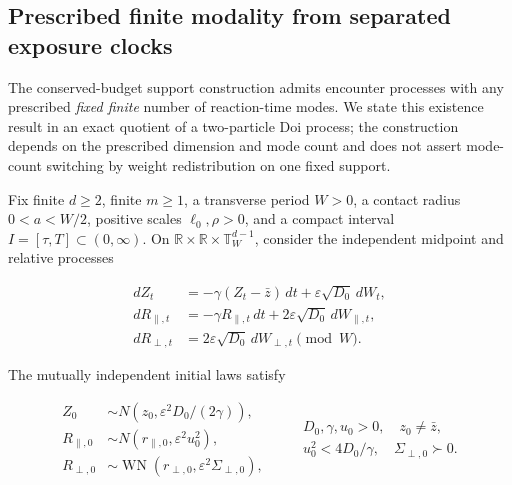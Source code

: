 
\subsection{Prescribed finite modality from separated exposure clocks}
\label{sec:exact-m-spine}

The conserved-budget support construction admits encounter processes with any
prescribed \emph{fixed finite} number of reaction-time modes.  We state this
existence result in an exact quotient of a two-particle Doi process; the
construction depends on the prescribed dimension and mode count and does not
assert mode-count switching by weight redistribution on one fixed support.

Fix finite $d\ge2$, finite $m\ge1$, a transverse period $W>0$, a contact
radius $0<a<W/2$, positive scales $\ell_0,\rho>0$, and a compact interval
$I=[\tau,T]\subset(0,\infty)$.
On $\mathbb R\times\mathbb R\times\mathbb T_W^{d-1}$, consider the
independent midpoint and relative processes

\begin{equation}
 \begin{aligned}
 dZ_t&=-\gamma(Z_t-\bar z)\,dt
       +\varepsilon\sqrt{D_0}\,dW_t,\\
 dR_{\parallel,t}&=-\gamma R_{\parallel,t}\,dt
       +2\varepsilon\sqrt{D_0}\,dW_{\parallel,t},\\
 dR_{\perp,t}&=2\varepsilon\sqrt{D_0}\,dW_{\perp,t}\pmod W.
 \end{aligned}
 \label{eq:exact-m-process}
\end{equation}

The mutually independent initial laws satisfy

\begin{equation}
 \begin{aligned}
 Z_0&\sim N\!\left(z_0,\varepsilon^2D_0/(2\gamma)\right),\\
 R_{\parallel,0}&\sim N(r_{\parallel,0},\varepsilon^2u_0^2),\\
 R_{\perp,0}&\sim
 \operatorname{WN}(r_{\perp,0},\varepsilon^2\Sigma_{\perp,0}),
 \end{aligned}
 \qquad
 \begin{gathered}
 D_0,\gamma,u_0>0,\quad z_0\ne\bar z,\\
 u_0^2<4D_0/\gamma,\quad \Sigma_{\perp,0}\succ0.
 \end{gathered}
 \label{eq:exact-m-initial}
\end{equation}

